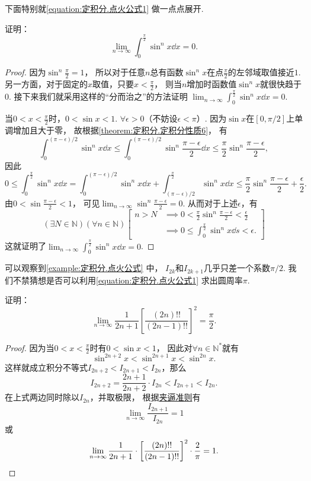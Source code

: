 下面特别就\cref{equation:定积分.点火公式1} 做一点点展开.
\begin{example}
证明：\begin{equation}
	\lim_{n\to\infty} \int_0^{\frac\pi2} \sin^n x \dd{x} = 0.
\end{equation}
\begin{proof}
因为\(\sin^n\frac{\pi}{2}=1\)，
所以对于任意\(n\)总有函数\(\sin^n x\)在点\(\frac{\pi}{2}\)的左邻域取值接近\(1\).
另一方面，对于固定的\(x\)取值，只要\(x<\frac{\pi}{2}\)，
则当\(n\)增加时函数值\(\sin^n x\)就很快趋于\(0\).
接下来我们就采用这样的“分而治之”的方法证明
\(\lim_{n\to\infty} \int_0^{\frac\pi2} \sin^n x \dd{x} = 0\).

当\(0<x<\frac{\pi}{2}\)时，\(0<\sin x<1\).
\(\forall\epsilon>0\)（不妨设\(\epsilon<\pi\)）.
因为\(\sin x\)在\([0,\pi/2]\)上单调增加且大于零，
故根据\cref{theorem:定积分.定积分性质6}，
有\[
	\int_0^{(\pi-\epsilon)/2} \sin^n x \dd{x}
	\leq
	\int_0^{(\pi-\epsilon)/2} \sin^n\frac{\pi-\epsilon}{2} \dd{x}
	\leq
	\frac{\pi}{2} \sin^n\frac{\pi-\epsilon}{2},
\]
因此\[
	0 \leq \int_0^{\frac\pi2} \sin^n x \dd{x}
	= \int_0^{(\pi-\epsilon)/2} \sin^n x \dd{x}
	+ \int_{(\pi-\epsilon)/2}^{\frac\pi2} \sin^n x \dd{x}
	\leq \frac{\pi}{2} \sin^n\frac{\pi-\epsilon}{2} + \frac{\epsilon}{2}.
\]
由\(0<\sin\frac{\pi-\epsilon}{2}<1\)，
可见\(\lim_{n\to\infty} \sin^n\frac{\pi-\epsilon}{2} = 0\).
从而对于上述\(\epsilon\)，有\[
	(\exists N\in\mathbb{N})
	(\forall n\in\mathbb{N})
	\left[
		\begin{array}{ll}
			n>N
			&\implies
			0<\frac{\pi}{2} \sin^n\frac{\pi-\epsilon}{2}<\frac{\epsilon}{2} \\
			&\implies
			0 \leq \int_0^{\frac\pi2} \sin^n x \dd{s} < \epsilon.
		\end{array}
	\right]
\]
这就证明了\(\lim_{n\to\infty} \int_0^{\frac\pi2} \sin^n x \dd{x} = 0\).
\end{proof}
\end{example}

可以观察到\cref{example:定积分.点火公式} 中，
\(I_{2k}\)和\(I_{2k+1}\)几乎只差一个系数\(\pi/2\).
我们不禁猜想是否可以利用\cref{equation:定积分.点火公式1} 求出圆周率\(\pi\).
\begin{example}[沃利斯公式]
证明：\begin{equation}\label{equation:定积分.沃利斯公式}
	\lim_{n\to\infty} \frac{1}{2n+1} \left[
		\frac{(2n)!!}{(2n-1)!!}
	\right]^2
	= \frac{\pi}{2}.
\end{equation}
\begin{proof}
因为当\(0<x<\frac{\pi}{2}\)时有\(0<\sin x<1\)，
因此对\(\forall n\in\mathbb{N}^*\)就有\[
	\sin^{2n+2} x < \sin^{2n+1} x < \sin^{2n} x.
\]
这样就成立积分不等式\(I_{2n+2} < I_{2n+1} < I_{2n}\)，那么\[
	I_{2n+2} = \frac{2n+1}{2n+2} \cdot I_{2n}
	< I_{2n+1} < I_{2n}.
\]
在上式两边同时除以\(I_{2n}\)，并取极限，
根据\hyperref[theorem:函数极限.夹逼准则]{夹逼准则}有\[
	\lim_{n\to\infty} \frac{I_{2n+1}}{I_{2n}} = 1
\]
或\[
	\lim_{n\to\infty} \frac{1}{2n+1} \cdot \left[
		\frac{(2n)!!}{(2n-1)!!}
	\right]^2 \cdot \frac{2}{\pi}
	= 1.
	\qedhere
\]
\end{proof}
\end{example}

